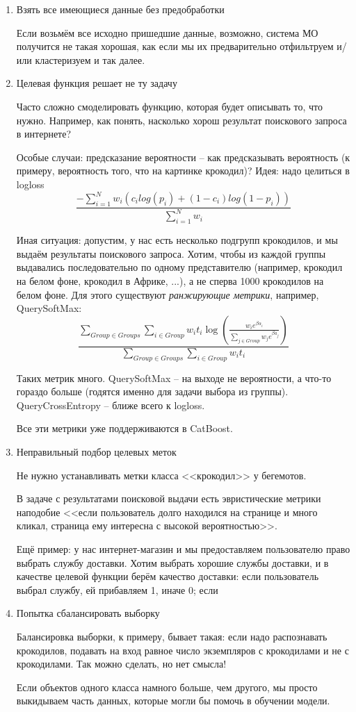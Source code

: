 \documentclass[main.tex]{subfiles}
\begin{document}
\begin{enumerate}[noitemsep]
	\item Взять все имеющиеся данные без предобработки
	
	Если возьмём все исходно пришедшие данные, возможно, система МО получится не такая хорошая, как если мы их предварительно отфильтруем и/или кластеризуем и так далее.
	\item Целевая функция решает не ту задачу
	
	Часто сложно смоделировать функцию, которая будет описывать то, что нужно.
	Например, как понять, насколько хорош результат поискового запроса в интернете?
	
	Особые случаи: предсказание вероятности -- как предсказывать вероятность (к примеру, вероятность того, что на картинке крокодил)?
	Идея: надо целиться в logloss 
	$$ \frac{-\sum_{i=1}^{N}w_i(c_i log(p_i) + (1-c_i)log(1 - p_i))}{\sum_{i=1}^{N} w_i}  $$
	
	Иная ситуация: допустим, у нас есть несколько подгрупп крокодилов, и мы выдаём результаты поискового запроса.
	Хотим, чтобы из каждой группы выдавались последовательно по одному представителю (например, крокодил на белом фоне, крокодил в Африке, ...), а не сперва 1000 крокодилов на белом фоне.
	Для этого существуют \emph{ранжирующие метрики}, например, QuerySoftMax: 
	$$ \frac{\sum_{Group \in Groups} \sum_{i \in Group} w_i t_i \log\left( \frac{w_i e^{\beta \alpha_i}}{\sum_{j \in Group} w_j e^{\beta a_j} } \right)}{\sum_{Group \in Groups} \sum_{i \in Group} w_i t_i} $$
	
	Таких метрик много.
	QuerySoftMax -- на выходе не вероятности, а что-то гораздо больше (годятся именно для задачи выбора из группы).
	QueryCrossEntropy -- ближе всего к logloss.
	
	Все эти метрики уже поддерживаются в CatBoost.
	
	\item Неправильный подбор целевых меток
	
	Не нужно устанавливать метки класса <<крокодил>> у бегемотов.
	
	В задаче с результатами поисковой выдачи есть эвристические метрики наподобие <<если пользователь долго находился на странице и много кликал, страница ему интересна с высокой вероятностью>>.
	
	Ещё пример: у нас интернет-магазин и мы предоставляем пользователю право выбрать службу доставки.
	Хотим выбрать хорошие службы доставки, и в качестве целевой функции берём качество доставки: если пользователь выбрал службу, ей прибавляем 1, иначе 0; если 
	
	\item Попытка сбалансировать выборку
	
	Балансировка выборки, к примеру, бывает такая: если надо распознавать крокодилов, подавать на вход равное число экземпляров с крокодилами и не с крокодилами.
	Так можно сделать, но нет смысла!
	
	Если объектов одного класса намного больше, чем другого, мы просто выкидываем часть данных, которые могли бы помочь в обучении модели.
\end{enumerate}
\end{document}
